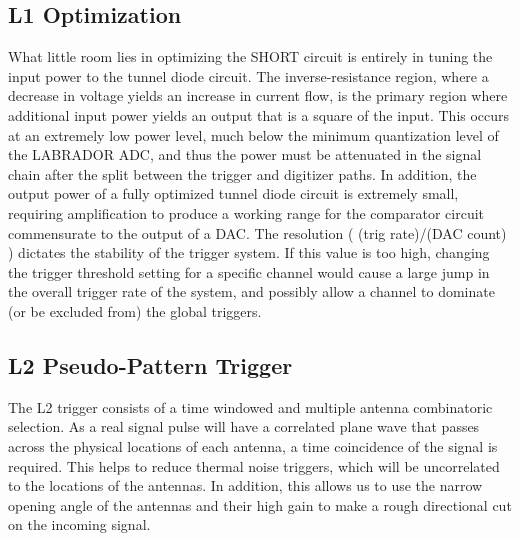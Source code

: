 	\subsection{L1 Optimization}
		What little room lies in optimizing the SHORT circuit is entirely in tuning the input power to the tunnel diode circuit.  The inverse-resistance region, where a decrease in voltage yields an increase in current flow, is the primary region where additional input power yields an output that is a square of the input.  This occurs at an extremely low power level, much below the minimum quantization level of the LABRADOR ADC, and thus the power must be attenuated in the signal chain after the split between the trigger and digitizer paths.  In addition, the output power of a fully optimized tunnel diode circuit is extremely small,	requiring amplification to produce a working range for the comparator circuit commensurate to the output of a DAC.  The resolution ( (trig rate)/(DAC count) ) dictates the stability of the trigger system.  If this value is too high, changing the trigger threshold setting for a specific channel would cause a large jump in the overall trigger rate of the system, and possibly allow a channel to dominate (or be excluded from) the global triggers.
		
		
	\subsection{L2 Pseudo-Pattern Trigger}
		The L2 trigger consists of a time windowed and multiple antenna combinatoric selection.  As a real signal pulse will have a correlated plane wave that passes across the physical locations of each antenna, a time coincidence of the signal is required.  This helps to reduce thermal noise triggers, which will be uncorrelated to the locations of the antennas.  In addition, this allows us to use the narrow opening angle of the antennas and their high gain to make a rough directional cut on the incoming signal.
		
